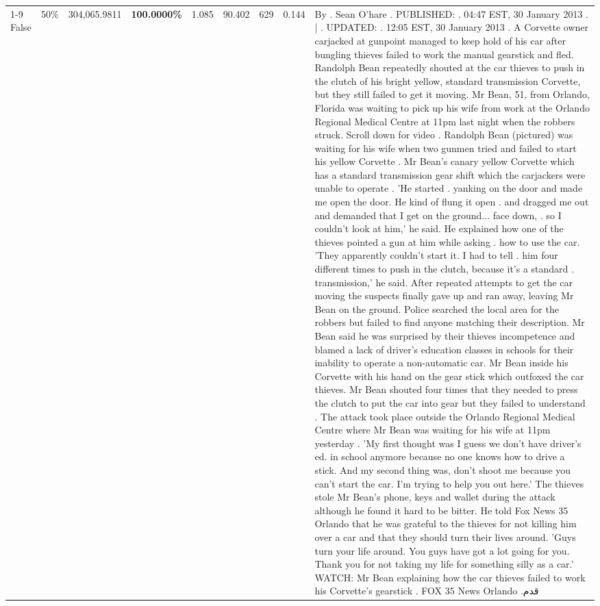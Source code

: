 \begin{table}[H]
\begin{tabular}{lllrlllll}
\cline{1-9} \cline{2-9}
False & 50\% & 304,065.9811 & \bfseries \color{red} 100.0000\% & 1.085 & 90.402 & 629 & 0.144 & By . Sean O'hare . PUBLISHED: . 04:47 EST, 30 January 2013 . | . UPDATED: . 12:05 EST, 30 January 2013 . A Corvette owner carjacked at gunpoint managed to keep hold of his car after bungling thieves failed to work the manual gearstick and fled. Randolph Bean repeatedly shouted at the car thieves to push in the clutch of his bright yellow, standard transmission Corvette, but they still failed to get it moving. Mr Bean, 51, from Orlando, Florida was waiting to pick up his wife from work at the Orlando Regional Medical Centre at 11pm last night when the robbers struck. Scroll down for video . Randolph Bean (pictured) was waiting for his wife when two gunmen tried and failed to start his yellow Corvette . Mr Bean's canary yellow Corvette which has a standard transmission gear shift which the carjackers were unable to operate . 'He started . yanking on the door and made me open the door. He kind of flung it open . and dragged me out and demanded that I get on the ground... face down, . so I couldn't look at him,' he said. He explained how one of the thieves pointed a gun at him while asking . how to use the car. 'They apparently couldn't start it. I had to tell . him four different times to push in the clutch, because it's a standard . transmission,' he said. After repeated attempts to get the car moving the suspects finally gave up and ran away, leaving Mr Bean on the ground. Police searched the local area for the robbers but failed to find anyone matching their description. Mr Bean said he was surprised by their thieves incompetence and blamed a lack of driver's education classes in schools for their inability to operate a non-automatic car. Mr Bean inside his Corvette with his hand on the gear stick which outfoxed the car thieves. Mr Bean shouted four times that they needed to press the clutch to put the car into gear but they failed to understand . The attack took place outside the Orlando Regional Medical Centre where Mr Bean was waiting for his wife at 11pm yesterday . 'My first thought was I guess we don't have driver's ed. in school anymore because no one knows how to drive a stick. And my second thing was, don't shoot me because you can't start the car. I'm trying to help you out here.' The thieves stole Mr Bean's phone, keys and wallet during the attack although he found it hard to be bitter. He told Fox News 35 Orlando that he was grateful to the thieves for not killing him over a car and that they should turn their lives around. 'Guys turn your life around. You guys have got a lot going for you. Thank you for not taking my life for something silly as a car.' WATCH: Mr Bean explaining how the car thieves failed to work his Corvette's gearstick . FOX 35 News Orlando .قدم \\

\end{tabular}
\end{table}
